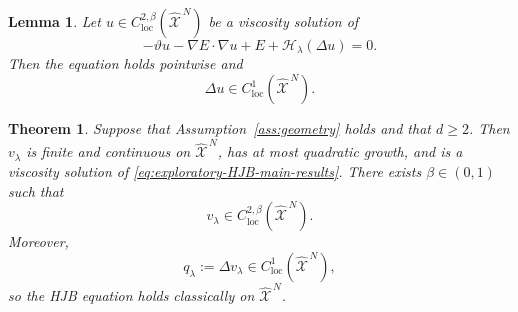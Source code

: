 \documentclass[10pt,a4paper]{amsart}
\newtheorem{theorem}{Theorem}
\newtheorem{lemma}{Lemma}
\def\Xc{{\mathcal X}}
\def\hX{\widehat{\Xc}^{\,N}}
\begin{document}
\begin{lemma}\label{lem:laplacian-C1}
Let $u\in C_{\mathrm{loc}}^{2,\beta}(\hX)$ be a viscosity solution of
\[
 -\vartheta u-\nabla E\cdot\nabla u+E+\mathscr H_\lambda(\Delta u)=0.
\]
Then the equation holds pointwise and
\begin{equation}\label{eq:laplacian-C1-lemma}
 \Delta u\in C_{\mathrm{loc}}^1(\hX).
\end{equation}
\end{lemma}

\begin{theorem}\label{thm:HJB}
Suppose that Assumption~\ref{ass:geometry} holds and that $d\ge2$.  Then $v_\lambda$ is finite and
continuous on $\hX$, has at most quadratic growth, and is a viscosity solution of
\eqref{eq:exploratory-HJB-main-results}.  There exists $\beta\in(0,1)$ such that
\begin{equation}\label{eq:v-C2beta}
 v_\lambda\in C^{2,\beta}_{\mathrm{loc}}(\hX).
\end{equation}
Moreover,
\begin{equation}\label{eq:q-C1}
 q_\lambda:=\Delta v_\lambda\in C^1_{\mathrm{loc}}(\hX),
\end{equation}
so the HJB equation holds classically on $\hX$.


\end{theorem}
\end{document}
